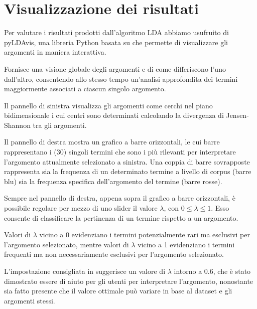 \section{Visualizzazione dei risultati}

Per valutare i risultati prodotti dall'algoritmo LDA abbiamo usufruito di pyLDAvis, una libreria Python basata su \cite{sievert2014ldavis} che permette di visualizzare gli argomenti in maniera interattiva. 
\par
Fornisce una visione globale degli argomenti e di come differiscono l'uno dall'altro, consentendo allo stesso tempo un'analisi approfondita dei termini maggiormente associati a ciascun singolo argomento.
\par
Il pannello di sinistra visualizza gli argomenti come cerchi nel piano bidimensionale i cui centri sono determinati calcolando la divergenza di Jensen-Shannon tra gli argomenti.
\par
Il pannello di destra mostra un grafico a barre orizzontali, le cui barre rappresentano i (30) singoli termini che sono i più rilevanti per interpretare l'argomento attualmente selezionato a sinistra. Una coppia di barre sovrapposte rappresenta sia la frequenza di un determinato termine a livello di corpus (barre blu) sia la frequenza specifica dell'argomento del termine (barre rosse).
\par
Sempre nel pannello di destra, appena sopra il grafico a barre orizzontali, è possibile regolare per mezzo di uno slider il valore $\lambda$, con $0 \leq \lambda \leq 1$. Esso consente di classificare la pertinenza di un termine rispetto a un argomento.
\par 
Valori di $\lambda$ vicino a 0 evidenziano i termini potenzialmente rari ma esclusivi per l'argomento selezionato, mentre valori di $ \lambda$ vicino a 1 evidenziano i termini frequenti ma non necessariamente esclusivi per l'argomento selezionato.
\par
L'impostazione consigliata in \cite{sievert2014ldavis} suggerisce un valore di $\lambda$ intorno a 0.6, che è stato dimostrato essere di aiuto per gli utenti per interpretare l'argomento, nonostante sia fatto presente che il valore ottimale può variare in base al dataset e gli argomenti stessi.
